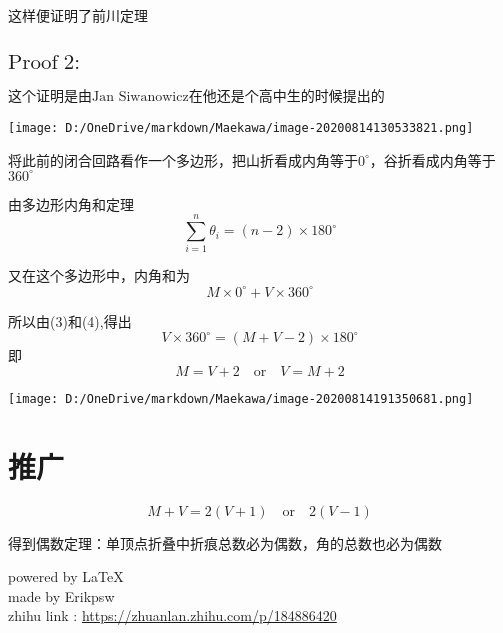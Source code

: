 \documentclass[a4paper,12pt]{article}
\begin{document}
这样便证明了前川定理\cite{demaine2007geometric}

\subsection{$\text{Proof}\;2:$}

这个证明是由$\text{Jan Siwanowicz}$在他还是个高中生的时候提出的
\begin{center}
\texttt{[image: D:/OneDrive/markdown/Maekawa/image-20200814130533821.png]}\\
\end{center}

将此前的闭合回路看作一个多边形，把山折看成内角等于$0^{\circ}$，谷折看成内角等于$360^{\circ}$

由多边形内角和定理
\begin{equation}\label{6}
    \sum\limits_{i=1}^n\theta_i=(n-2)×180^{\circ}
    \end{equation}


又在这个多边形中，内角和为
\begin{equation}\label{7}
    M \times 0^{\circ} +V \times 360^{\circ}
    \end{equation}


所以由(3)和(4),得出
\begin{equation}\label{8}
    V\times 360^{\circ} = (M +V-2)\times 180^{\circ}
    \end{equation}
即
\begin{equation}\label{9}
    M = V +2 \quad \text{or}\quad V = M + 2
    \end{equation}
\begin{center}
\texttt{[image: D:/OneDrive/markdown/Maekawa/image-20200814191350681.png]}\\
\end{center}

\section{推广}
\begin{equation}\label{3}
    M + V = 2(V+1) \quad \text{or} \quad2(V- 1)
    \end{equation}

得到偶数定理：单顶点折叠中折痕总数必为偶数，角的总数也必为偶数
\begin{flushright}
    powered by \LaTeX\\
    made by Erikpsw\\ 
    zhihu link : \url{https://zhuanlan.zhihu.com/p/184886420}
\end{flushright}



\end{document}
